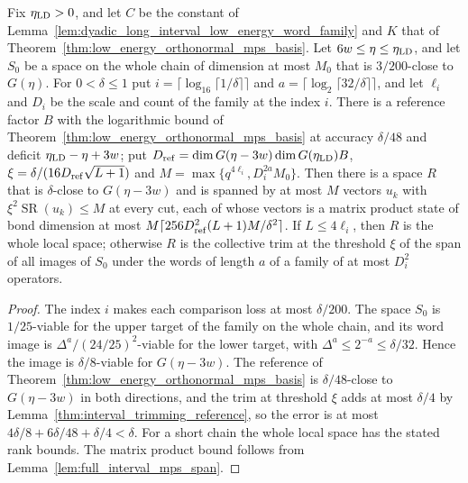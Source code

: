 \begin{lemma}
    \label{lem:physical_ld_root_refinement}
    \leanok
    Fix $\eta_{\rm LD}>0$, and let $C$ be the constant of
    Lemma~\ref{lem:dyadic_long_interval_low_energy_word_family} and $K$ that
    of Theorem~\ref{thm:low_energy_orthonormal_mps_basis}. Let
    $6w\le\eta\le\eta_{\rm LD}$, and let $S_0$ be a space on the whole chain of dimension at
    most $M_0$ that is $3/200$-close to $G(\eta)$. For $0<\delta\le1$ put
    $i=\lceil\log_{16}\lceil1/\delta\rceil\rceil$ and
    $a=\lceil\log_2\lceil32/\delta\rceil\rceil$, and let $\ell_i$ and $D_i$ be
    the scale and count of the family at the index $i$. There is a reference
    factor $B$ with the logarithmic bound of
    Theorem~\ref{thm:low_energy_orthonormal_mps_basis} at accuracy
    $\delta/48$ and deficit $\eta_{\rm LD}-\eta+3w$; put
    $D_{\rm ref}=\dim G(\eta-3w)\dim G(\eta_{\rm LD})B$,
    $\xi=\delta/(16D_{\rm ref}\sqrt{L+1})$ and
    $M=\max\{q^{4\ell_i},D_i^{2a}M_0\}$. Then there is a space $R$ that is
    $\delta$-close to $G(\eta-3w)$ and is spanned by at most $M$ vectors $u_k$
    with $\xi^2\operatorname{SR}(u_k)\le M$ at every cut, each of whose vectors
    is a matrix product state of bond dimension at most
    $M\lceil256D_{\rm ref}^2(L+1)M/\delta^2\rceil$. If $L\le4\ell_i$, then $R$
    is the whole local space; otherwise $R$ is the collective trim at the
    threshold $\xi$ of the span of all images of $S_0$ under the words of
    length $a$ of a family of at most $D_i^2$ operators.
\end{lemma}
\begin{proof}\leanok
    The index $i$ makes each comparison loss at most $\delta/200$. The space
    $S_0$ is $1/25$-viable for the upper target of the family on the whole
    chain, and its word image is $\Delta^a/(24/25)^2$-viable for the lower
    target, with $\Delta^a\le2^{-a}\le\delta/32$. Hence the image is
    $\delta/8$-viable for $G(\eta-3w)$. The reference of
    Theorem~\ref{thm:low_energy_orthonormal_mps_basis} is $\delta/48$-close to
    $G(\eta-3w)$ in both directions, and the trim at threshold $\xi$ adds at
    most $\delta/4$ by Lemma~\ref{thm:interval_trimming_reference}, so the
    error is at most $4\delta/8+6\delta/48+\delta/4<\delta$. For a short chain
    the whole local space has the stated rank bounds. The matrix product bound
    follows from Lemma~\ref{lem:full_interval_mps_span}.
\end{proof}

